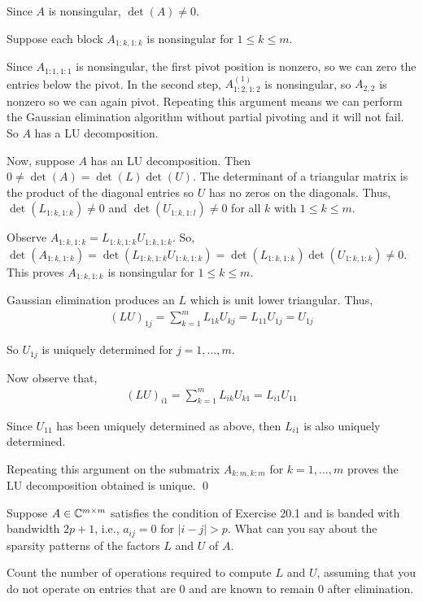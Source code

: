 \documentclass[10pt]{article}
\begin{document}
\begin{solution}[Solution]
Since \( A \) is nonsingular, \( \det(A)\neq 0 \). 

Suppose each block \( A_{1:k,1:k} \) is nonsingular for \( 1\leq k\leq m \).

Since \( A_{1:1,1:1} \) is nonsingular, the first pivot position is nonzero, so we can zero the entries below the pivot. In the second step, \( A^{(1)}_{1:2,1:2} \) is nonsingular, so \( A_{2,2} \) is nonzero so we can again pivot. Repeating this argument means we can perform the Gaussian elimination algorithm without partial pivoting and it will not fail.  So \( A \) has a LU decomposition.


Now, suppose \( A \) has an LU decomposition. Then \( 0\neq \det(A) = \det(L)\det(U) \). The determinant of a triangular matrix is the product of the diagonal entries so \( U \) has no zeros on the diagonals. Thus, \( \det(L_{1:k,1:k})\neq 0 \) and \( \det(U_{1:k,1:l})\neq 0 \) for all \( k \) with \( 1\leq k\leq m \).

Observe \( A_{1:k,1:k} = L_{1:k,1:k} U_{1:k,1:k} \). So, \( \det(A_{1:k,1:k}) = \det(L_{1:k,1:k} U_{1:k,1:k}) = \det(L_{1:k,1:k})\det(U_{1:k,1:k})\neq 0 \). This proves \( A_{1:k,1:k} \) is nonsingular for \( 1\leq k\leq m \).


Gaussian elimination produces an \( L \) which is unit lower triangular. Thus,
\begin{align*}
    (LU)_{1j} = \sum_{k=1}^{m}L_{1k}U_{kj} = L_{11}U_{1j} = U_{1j}
\end{align*}

So \( U_{1j} \) is uniquely determined for \( j=1, ..., m \).

Now observe that,
\begin{align*}
    (LU)_{i1} = \sum_{k=1}^{m}L_{ik}U_{k1} = L_{i1}U_{11}
\end{align*}

Since \( U_{11} \) has been uniquely determined as above, then \( L_{i1} \) is also uniquely determined. 

Repeating this argument on the submatrix \( A_{k:m,k:m} \) for \( k=1, ..., m \) proves the LU decomposition obtained is unique. \qed

\end{solution}

\begin{problem}[Exercise 20.2]
 Suppose \( A\in\mathbb{C}^{m\times m} \) satisfies the condition of Exercise 20.1 and is banded with bandwidth \( 2p+1 \), i.e., \( a_{ij}=0 \) for \( |i-j|>p \). What can you say about the sparsity patterns of the factors \( L \) and \( U \) of \( A \).

Count the number of operations required to compute \(L\) and \(U\), assuming that you do not operate on entries that are \(0\) and are known to remain \(0\) after elimination.
\end{problem}
\end{document}
